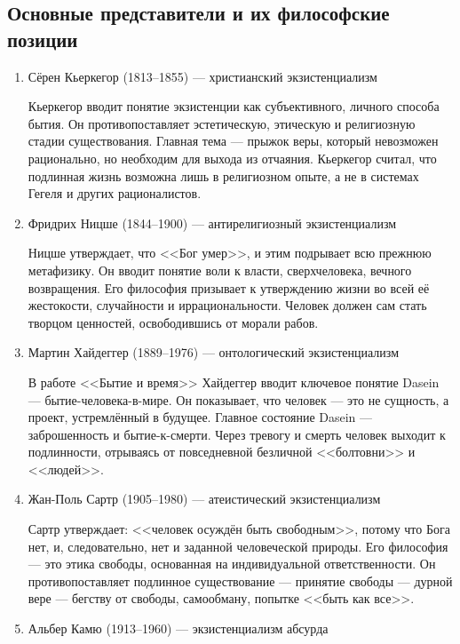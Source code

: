 \documentclass[12pt,a4paper]{article}
\begin{document}
	\subsection{Основные представители и их философские позиции}
	\begin{enumerate}
		\item Сёрен Кьеркегор (1813–1855) — христианский экзистенциализм
		
		Кьеркегор вводит понятие экзистенции как субъективного, личного способа бытия. Он противопоставляет эстетическую, этическую и религиозную стадии существования. Главная тема — прыжок веры, который невозможен рационально, но необходим для выхода из отчаяния. Кьеркегор считал, что подлинная жизнь возможна лишь в религиозном опыте, а не в системах Гегеля и других рационалистов.
		
		\item Фридрих Ницше (1844–1900) — антирелигиозный экзистенциализм
		
		Ницше утверждает, что <<Бог умер>>, и этим подрывает всю прежнюю метафизику. Он вводит понятие воли к власти, сверхчеловека, вечного возвращения. Его философия призывает к утверждению жизни во всей её жестокости, случайности и иррациональности. Человек должен сам стать творцом ценностей, освободившись от морали рабов.
		
		\item Мартин Хайдеггер (1889–1976) — онтологический экзистенциализм
		
		В работе <<Бытие и время>> Хайдеггер вводит ключевое понятие Dasein — бытие-человека-в-мире. Он показывает, что человек — это не сущность, а проект, устремлённый в будущее. Главное состояние Dasein — заброшенность и бытие-к-смерти. Через тревогу и смерть человек выходит к подлинности, отрываясь от повседневной безличной <<болтовни>> и <<людей>>.
		
		\item Жан-Поль Сартр (1905–1980) — атеистический экзистенциализм
		
		Сартр утверждает: <<человек осуждён быть свободным>>, потому что Бога нет, и, следовательно, нет и заданной человеческой природы. Его философия — это этика свободы, основанная на индивидуальной ответственности. Он противопоставляет подлинное существование — принятие свободы — дурной вере — бегству от свободы, самообману, попытке <<быть как все>>.
		
		\item Альбер Камю (1913–1960) — экзистенциализм абсурда
		

\end{enumerate}
\end{document}
